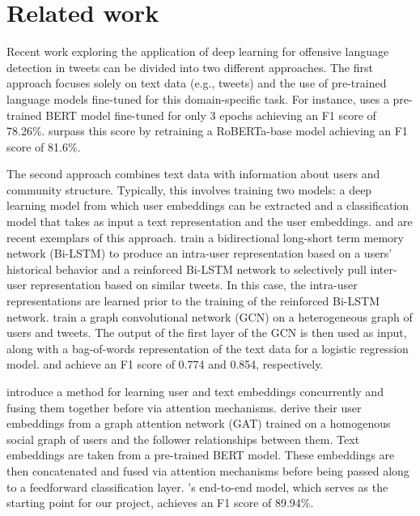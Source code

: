 \documentclass[letterpaper]{article} %
\begin{document}
\section{Related work}

Recent work exploring the application of deep learning for offensive language detection in tweets can be divided into two different approaches. The first approach focuses solely on text data (e.g., tweets) and the use of pre-trained language models fine-tuned for this domain-specific task. For instance, \citet{liu2019-nuli} uses a pre-trained BERT model fine-tuned for only 3 epochs achieving an F1 score of 78.26\%. \citet{Barbieri2020} surpass this score by retraining a RoBERTa-base model achieving an F1 score of 81.6\%.

The second approach combines text data with information about users and community structure. Typically, this involves training two models: a deep learning model from which user embeddings can be extracted and a classification model that takes as input a text representation and the user embeddings. \citet{qian-etal-2018-leveraging} and \citet{Mishra2019} are recent exemplars of this approach. \citet{qian-etal-2018-leveraging} train a bidirectional long-short term memory network (Bi-LSTM) to produce an intra-user representation based on a users' historical behavior and a reinforced Bi-LSTM network to selectively pull inter-user representation based on similar tweets. In this case, the intra-user representations are learned prior to the training of the reinforced Bi-LSTM network. \citet{Mishra2019} train a graph convolutional network (GCN) on a heterogeneous graph of users and tweets. The output of the first layer of the GCN is then used as input, along with a bag-of-words representation of the text data for a logistic regression model. \citet{qian-etal-2018-leveraging} and \citet{Mishra2019} achieve an F1 score of 0.774 and 0.854, respectively.


\citet{Miao2022} introduce a method for learning user and text embeddings concurrently and fusing them together before via attention mechanisms. \citet{Miao2022} derive their user embeddings from a graph attention network (GAT) trained on a homogenous social graph of users and the follower relationships between them. Text embeddings are taken from a pre-trained BERT model. These embeddings are then concatenated and fused via attention mechanisms before being passed along to a feedforward classification layer. \citet{Miao2022}'s end-to-end model, which serves as the starting point for our project, achieves an F1 score of 89.94\%.
\end{document}
